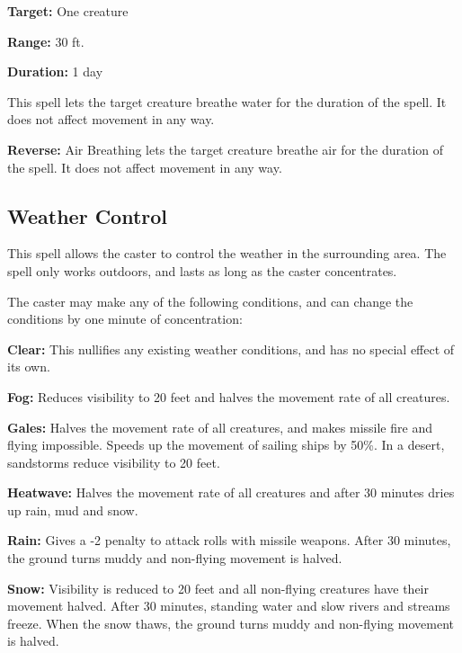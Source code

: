 \begin{multicols*}{2}
{\textbf{Target:} One creature

\textbf{Range:} 30 ft.

\textbf{Duration:} 1 day}

This spell lets the target creature breathe water for the duration of the spell. It does not affect movement in any way.

\textbf{Reverse:} Air Breathing lets the target creature breathe air for the duration of the spell. It does not affect movement in any way.

\subsection{Weather Control}\label{spell:Weather Control}

This spell allows the caster to control the weather in the surrounding area. The spell only works outdoors, and lasts as long as the caster concentrates.

The caster may make any of the following conditions, and can change the conditions by one minute of concentration:

\textbf{Clear:} This nullifies any existing weather conditions, and has no special effect of its own.

\textbf{Fog:} Reduces visibility to 20 feet and halves the movement rate of all creatures.

\textbf{Gales:} Halves the movement rate of all creatures, and makes missile fire and flying impossible. Speeds up the movement of sailing ships by 50\%. In a desert, sandstorms reduce visibility to 20 feet.

\textbf{Heatwave:} Halves the movement rate of all creatures and after 30 minutes dries up rain, mud and snow.

\textbf{Rain:} Gives a -2 penalty to attack rolls with missile weapons. After 30 minutes, the ground turns muddy and non-flying movement is halved.

\textbf{Snow:} Visibility is reduced to 20 feet and all non-flying creatures have their movement halved. After 30 minutes, standing water and slow rivers and streams freeze. When the snow thaws, the ground turns muddy and non-flying movement is halved.


\end{multicols*}
